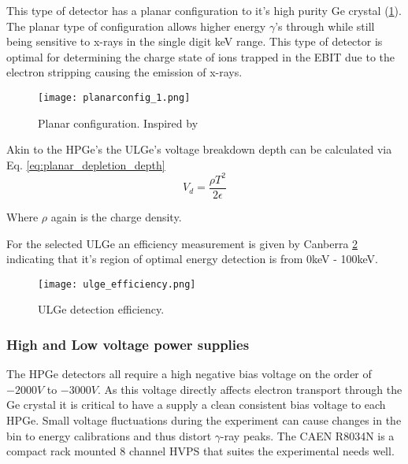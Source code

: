 \documentclass[jon_ringuette_thesis_proposal.tex]{subfiles}
\begin{document}
    This type of detector has a planar configuration to it's high purity Ge crystal (\ref{fig:ULGE_planar_config}).
    The planar type of configuration allows higher energy $\gamma$'s through while still being sensitive to x-rays in the single digit keV range.
    This type of detector is optimal for determining the charge state of ions trapped in the EBIT due to the electron stripping causing the emission of x-rays.
    \begin{figure}[H]
        \begin{center}
            \texttt{[image: planarconfig\_1.png]}
        \end{center}
        \caption{\small Planar configuration. Inspired by \cite{KNOLL}}
        \label{fig:ULGE_planar_config}
    \end{figure}

    Akin to the HPGe's the ULGe's voltage breakdown depth can be calculated via Eq. \ref{eq:planar_depletion_depth}
    \begin{equation}
        V_d = \frac{\rho T^2}{2 \epsilon}
        \label{eq:planar_depletion_depth}
    \end{equation}

    Where $\rho$ again is the charge density.

    For the selected ULGe an efficiency measurement is given by Canberra \ref{fig:ULGE_EFFICIENCY} indicating that it's region of optimal energy detection is from 0keV - 100keV.
    \begin{figure}[H]
        \begin{center}
            \texttt{[image: ulge\_efficiency.png]}
        \end{center}
        \caption{\small ULGe detection efficiency. \cite{mesytec_mdpp16_manual}}
        \label{fig:ULGE_EFFICIENCY}
    \end{figure}


    \subsubsection{High and Low voltage power supplies}
    The HPGe detectors all require a high negative bias voltage on the order of $-2000V$ to $-3000V$. As this voltage directly affects electron transport through the Ge crystal it is critical to have a supply a clean consistent bias voltage to each HPGe.
    Small voltage fluctuations during the experiment can cause changes in the bin to energy calibrations and thus distort $\gamma$-ray peaks.
    The CAEN R8034N is a compact rack mounted 8 channel HVPS that suites the experimental needs well.
\end{document}
